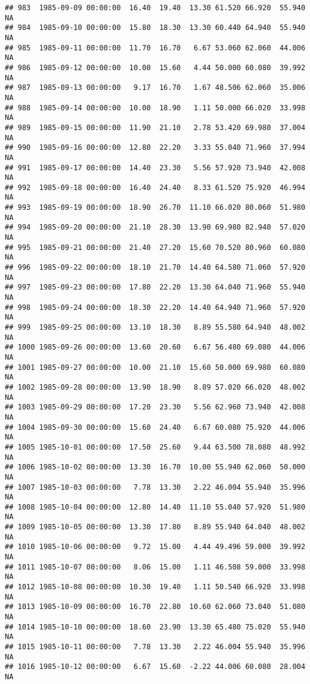 \documentclass{article}\usepackage{graphicx, color}
\makeatletter
\newenvironment{kframe}{%
 \def\at@end@of@kframe{}%
 \ifinner\ifhmode%
  \def\at@end@of@kframe{\end{minipage}}%
  \begin{minipage}{\columnwidth}%
 \fi\fi%
 \def\FrameCommand##1{\hskip\@totalleftmargin \hskip-\fboxsep
 \colorbox{shadecolor}{##1}\hskip-\fboxsep
     \hskip-\linewidth \hskip-\@totalleftmargin \hskip\columnwidth}%
 \MakeFramed {\advance\hsize-\width
   \@totalleftmargin\z@ \linewidth\hsize
   \@setminipage}}%
 {\par\unskip\endMakeFramed%
 \at@end@of@kframe}
\newenvironment{knitrout}{}{} %
\makeatother
\begin{document}
\begin{knitrout}
\begin{kframe}
\begin{verbatim}
## 983  1985-09-09 00:00:00  16.40  19.40  13.30 61.520 66.920  55.940     NA
## 984  1985-09-10 00:00:00  15.80  18.30  13.30 60.440 64.940  55.940     NA
## 985  1985-09-11 00:00:00  11.70  16.70   6.67 53.060 62.060  44.006     NA
## 986  1985-09-12 00:00:00  10.00  15.60   4.44 50.000 60.080  39.992     NA
## 987  1985-09-13 00:00:00   9.17  16.70   1.67 48.506 62.060  35.006     NA
## 988  1985-09-14 00:00:00  10.00  18.90   1.11 50.000 66.020  33.998     NA
## 989  1985-09-15 00:00:00  11.90  21.10   2.78 53.420 69.980  37.004     NA
## 990  1985-09-16 00:00:00  12.80  22.20   3.33 55.040 71.960  37.994     NA
## 991  1985-09-17 00:00:00  14.40  23.30   5.56 57.920 73.940  42.008     NA
## 992  1985-09-18 00:00:00  16.40  24.40   8.33 61.520 75.920  46.994     NA
## 993  1985-09-19 00:00:00  18.90  26.70  11.10 66.020 80.060  51.980     NA
## 994  1985-09-20 00:00:00  21.10  28.30  13.90 69.980 82.940  57.020     NA
## 995  1985-09-21 00:00:00  21.40  27.20  15.60 70.520 80.960  60.080     NA
## 996  1985-09-22 00:00:00  18.10  21.70  14.40 64.580 71.060  57.920     NA
## 997  1985-09-23 00:00:00  17.80  22.20  13.30 64.040 71.960  55.940     NA
## 998  1985-09-24 00:00:00  18.30  22.20  14.40 64.940 71.960  57.920     NA
## 999  1985-09-25 00:00:00  13.10  18.30   8.89 55.580 64.940  48.002     NA
## 1000 1985-09-26 00:00:00  13.60  20.60   6.67 56.480 69.080  44.006     NA
## 1001 1985-09-27 00:00:00  10.00  21.10  15.60 50.000 69.980  60.080     NA
## 1002 1985-09-28 00:00:00  13.90  18.90   8.89 57.020 66.020  48.002     NA
## 1003 1985-09-29 00:00:00  17.20  23.30   5.56 62.960 73.940  42.008     NA
## 1004 1985-09-30 00:00:00  15.60  24.40   6.67 60.080 75.920  44.006     NA
## 1005 1985-10-01 00:00:00  17.50  25.60   9.44 63.500 78.080  48.992     NA
## 1006 1985-10-02 00:00:00  13.30  16.70  10.00 55.940 62.060  50.000     NA
## 1007 1985-10-03 00:00:00   7.78  13.30   2.22 46.004 55.940  35.996     NA
## 1008 1985-10-04 00:00:00  12.80  14.40  11.10 55.040 57.920  51.980     NA
## 1009 1985-10-05 00:00:00  13.30  17.80   8.89 55.940 64.040  48.002     NA
## 1010 1985-10-06 00:00:00   9.72  15.00   4.44 49.496 59.000  39.992     NA
## 1011 1985-10-07 00:00:00   8.06  15.00   1.11 46.508 59.000  33.998     NA
## 1012 1985-10-08 00:00:00  10.30  19.40   1.11 50.540 66.920  33.998     NA
## 1013 1985-10-09 00:00:00  16.70  22.80  10.60 62.060 73.040  51.080     NA
## 1014 1985-10-10 00:00:00  18.60  23.90  13.30 65.480 75.020  55.940     NA
## 1015 1985-10-11 00:00:00   7.78  13.30   2.22 46.004 55.940  35.996     NA
## 1016 1985-10-12 00:00:00   6.67  15.60  -2.22 44.006 60.080  28.004     NA

\end{verbatim}
\end{kframe}
\end{knitrout}
\end{document}
